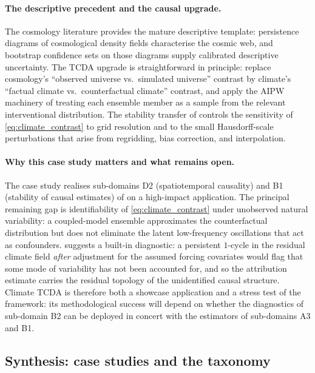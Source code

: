 \paragraph{The descriptive precedent and the causal upgrade.}
The cosmology literature \citep{sousbie2011persistent,
vandeweygaert2011alpha,cisewski2014nonparametric} provides the mature
descriptive template: persistence diagrams of cosmological density
fields characterise the cosmic web, and bootstrap confidence sets
on those diagrams supply calibrated descriptive uncertainty. The TCDA
upgrade is straightforward in principle: replace cosmology's
``observed universe vs.\ simulated universe'' contrast by climate's
``factual climate vs.\ counterfactual climate'' contrast, and apply
the AIPW machinery of \citet{kim2026topological} treating each ensemble
member as a sample from the relevant interventional distribution. The
stability transfer of  controls the
sensitivity of \cref{eq:climate_contrast} to grid resolution and to
the small Hausdorff-scale perturbations that arise from regridding,
bias correction, and interpolation.

\paragraph{Why this case study matters and what remains open.}
The case study realises sub-domains D2 (spatiotemporal causality) and
B1 (stability of causal estimates) of  on a
high-impact application. The principal remaining gap is identifiability
of \cref{eq:climate_contrast} under unobserved natural variability:
a coupled-model ensemble approximates the counterfactual distribution
but does not eliminate the latent low-frequency oscillations that act
as confounders.  suggests a built-in
diagnostic: a persistent $1$-cycle in the residual climate field
\emph{after} adjustment for the assumed forcing covariates would
flag that some mode of variability has not been accounted for, and so
the attribution estimate carries the residual topology of the
unidentified causal structure. Climate TCDA is therefore both a
showcase application and a stress test of the framework: its
methodological success will depend on whether the diagnostics of
sub-domain B2 can be deployed in concert with the estimators of
sub-domains A3 and B1.

\subsection{Synthesis: case studies and the taxonomy}\label{sec:cs_synthesis}

